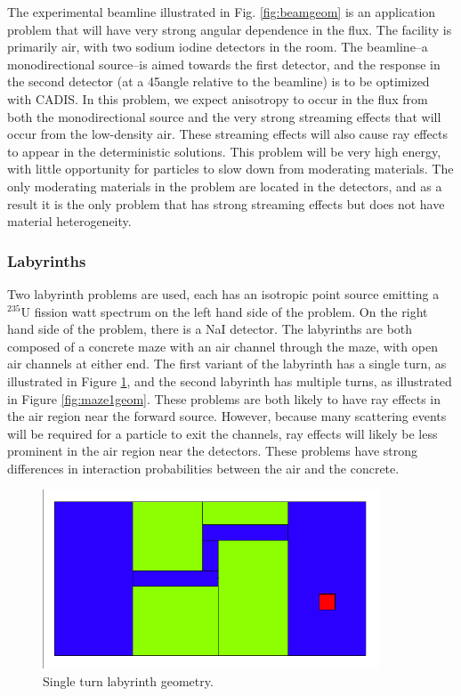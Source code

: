 The experimental beamline illustrated in Fig. \ref{fig:beamgeom} is an
application problem that will have very strong angular dependence in the flux. The
facility is primarily air, with two sodium iodine detectors in the room. The
beamline--a monodirectional source--is aimed towards the first detector, and
the response in the second detector (at a 45\degree angle
relative to the beamline) is to be optimized with CADIS. In this problem, we
expect anisotropy to occur in the flux from both the monodirectional source and
the very strong streaming effects that will occur from the low-density air.
These streaming effects will also cause ray effects to appear in the
deterministic solutions. This
problem will be very high energy, with little opportunity for particles to
slow down from moderating materials. The only moderating materials in the
problem are located in the detectors, and as a result it is the only problem
that has strong streaming effects but does not have material heterogeneity.

\subsubsection*{Labyrinths}

Two labyrinth problems are used, each has an isotropic point source emitting a $^{235}$U fission watt spectrum on the left hand side of the
problem.
On the right hand side of the problem, there is a NaI detector.
The labyrinths are both composed of a concrete maze with an air channel through the maze, with open air channels at either end. The first variant of the
labyrinth has a single turn, as illustrated in Figure \ref{fig:maze2geom}, and
the second labyrinth has multiple turns, as illustrated in Figure
\ref{fig:maze1geom}. These problems are both
likely to have ray effects in the air region near the forward source. However,
because many scattering events will be required for a particle to exit the
channels, ray effects will likely be less prominent in the
air region near the detectors. 
These  problems have strong
differences in interaction probabilities between the air and the concrete. 

\begin{figure}[h!]
  \centering
  \includegraphics[width=10cm]{./chapters/characterization_probs/figures/geometries/maze2.png}
  \caption[Single turn labyrinth geometry.]{Single turn labyrinth geometry.}
  \label{fig:maze2geom}
\end{figure}

